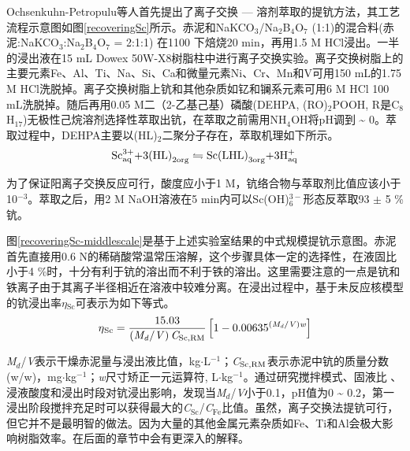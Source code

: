 Ochsenkuhn-Petropulu\cite{ochsenkuhn1995selective}等人首先提出了离子交换 — 溶剂萃取的提钪方法，其工艺流程示意图如图\ref{recoveringSc}所示。赤泥和NaKCO$ _{\mathrm{3}} $/Na$ _{\mathrm{2}} $B$ _{\mathrm{4}} $O$ _{\mathrm{7}} $ (1:1)的混合料(赤泥:NaKCO$ _{\mathrm{3}} $:Na$ _{\mathrm{2}} $B$ _{\mathrm{4}} $O$ _{\mathrm{7}} $ = 2:1:1) 在1100 \textcelsius 下焙烧20 min，再用1.5 M HCl浸出。一半的浸出液在15 mL Dowex 50W-X8树脂柱中进行离子交换实验。离子交换树脂上的主要元素Fe、Al、Ti、Na、Si、Ca和微量元素Ni、Cr、Mn和V可用150 mL的1.75 M HCl洗脱掉。离子交换树脂上钪和其他杂质如钇和镧系元素可用6 M HCl 100 mL洗脱掉。随后再用0.05 M二（2-乙基己基）磷酸(DEHPA, (RO)$ _{\mathrm{2}} $POOH,  R是C$ _{\mathrm{8}} $H$ _{\mathrm{17}} $)无极性己烷溶剂选择性萃取出钪，在萃取之前需用NH$ _{\mathrm{4}} $OH将pH调到 \textasciitilde{ }0。萃取过程中，DEHPA主要以(HL)$ _{\mathrm{2}} $二聚分子存在，萃取机理如下所示\cite{ochsenkuhn1995selective,forsberg1983gmelin}。
\begin{equation}
{\rm{Sc}}_{{\rm{aq}}}^{{\rm{3 + }}}{\rm{ + 3}}{\left( {{\rm{HL}}} \right)_{{\rm{2org}}}} \leftrightharpoons {\rm{Sc}}{\left( {{\rm{LHL}}} \right)_{{\rm{3org}}}}{\rm{ + 3H}}_{{\rm{aq}}}^{\rm{ + }}
\end{equation}

为了保证阳离子交换反应可行，酸度应小于1 M，钪络合物与萃取剂比值应该小于10$ ^{\mathrm{-3}} $。萃取之后，用2 M NaOH溶液在5 min内可以Sc(OH)$ _{\mathrm{6}}^{\mathrm{3-}} $形态反萃取93 $ \pm $ 5 \%钪。

图\ref{recoveringSc-middlescale}是基于上述实验室结果的中式规模提钪示意图\cite{ochsenkuhn2002pilot}。赤泥首先直接用0.6 N的稀硝酸常温常压溶解，这个步骤具体一定的选择性，在液固比小于4 \%时，十分有利于钪的溶出而不利于铁的溶出。这里需要注意的一点是钪和铁离子由于其离子半径相近在溶液中较难分离\cite{ochsenkuhn1996recovery}。在浸出过程中，基于未反应核模型的钪浸出率$ \eta\mathrm{_{Sc}} $可表示为如下等式。
\begin{equation}
{\eta \rm{_{Sc}}} = \frac{{\rm{15.03}}}{{\left( {{{{\mathit{M_d}}} \mathord{\left/
					{\vphantom {{{\mathit{M_d}}} \mathit{V}}} \right.
					\kern-\nulldelimiterspace} \mathit{V}}} \right){\mathit{C}_{\rm{{Sc,RM}}}}}}\left[ {{\rm{1}} - {{\rm{0.00635}}^{\left( {{{{\mathit{M_d}}} \mathord{\left/
						{\vphantom {{{\mathit{M_d}}} \mathit{V}}} \right.
						\kern-\nulldelimiterspace} \mathit{V}}} \right)\textit{w}}}} \right]
\end{equation}

\textit{M$ _\mathit{d} $}/\textit{V}表示干燥赤泥量与浸出液比值，kg$\cdot$L$^{\mathrm{-1}}$；\textit{C}$ \rm{_{Sc,RM}} $表示赤泥中钪的质量分数(w/w)，mg$\cdot$kg$^{\mathrm{-1}}$；\textit{w}尺寸矫正一元运算符, L$\cdot$kg$ ^{\mathrm{-1}} $。通过研究搅拌模式、固液比 、浸液酸度和浸出时段对钪浸出影响，发现当\textit{M$ _d $}/\textit{V}小于0.1，pH值为0 \textasciitilde{ }0.2，第一浸出阶段搅拌充足时可以获得最大的\textit{C}$ _{\mathrm{Sc}} $/\textit{C}$ _{\mathrm{Fe}} $比值。虽然，离子交换法提钪可行，但它并不是最明智的做法。因为大量的其他金属元素杂质如Fe、Ti和Al会极大影响树脂效率\cite{wang2011separation}。在后面的章节中会有更深入的解释。

